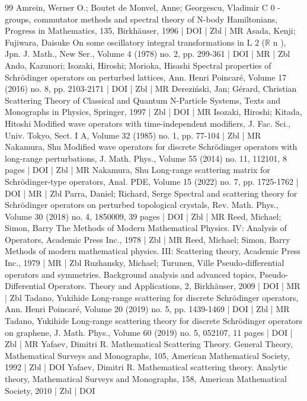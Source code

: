\begin{thebibliography}{99}
 Amrein, Werner O.; Boutet de Monvel, Anne; Georgescu, Vladimir C 0 -groups, commutator methods and spectral theory of N-body Hamiltonians, Progress in Mathematics, 135, Birkhäuser, 1996 | DOI | Zbl | MR
 Asada, Kenji; Fujiwara, Daisuke On some oscillatory integral transformations in L 2 ($\mathbb{R}$ n ), Jpn. J. Math., New Ser., Volume 4 (1978) no. 2, pp. 299-361 | DOI | MR | Zbl
 Ando, Kazunori; Isozaki, Hiroshi; Morioka, Hisashi Spectral properties of Schrödinger operators on perturbed lattices, Ann. Henri Poincaré, Volume 17 (2016) no. 8, pp. 2103-2171 | DOI | Zbl | MR
 Dereziński, Jan; Gérard, Christian Scattering Theory of Classical and Quantum N-Particle Systems, Texts and Monographs in Physics, Springer, 1997 | Zbl | DOI | MR
 Isozaki, Hiroshi; Kitada, Hitoshi Modified wave operators with time-independent modifiers, J. Fac. Sci., Univ. Tokyo, Sect. I A, Volume 32 (1985) no. 1, pp. 77-104 | Zbl | MR
 Nakamura, Shu Modified wave operators for discrete Schrödinger operators with long-range perturbations, J. Math. Phys., Volume 55 (2014) no. 11, 112101, 8 pages | DOI | Zbl | MR
 Nakamura, Shu Long-range scattering matrix for Schrödinger-type operators, Anal. PDE, Volume 15 (2022) no. 7, pp. 1725-1762 | DOI | MR | Zbl
 Parra, Daniel; Richard, Serge Spectral and scattering theory for Schrödinger operators on perturbed topological crystals, Rev. Math. Phys., Volume 30 (2018) no. 4, 1850009, 39 pages | DOI | Zbl | MR
 Reed, Michael; Simon, Barry The Methods of Modern Mathematical Physics. IV: Analysis of Operators, Academic Press Inc., 1978 | Zbl | MR
 Reed, Michael; Simon, Barry Methods of modern mathematical physics. III: Scattering theory, Academic Press Inc., 1979 | MR | Zbl
 Ruzhansky, Michael; Turunen, Ville Pseudo-differential operators and symmetries. Background analysis and advanced topics, Pseudo-Differential Operators. Theory and Applications, 2, Birkhäuser, 2009 | DOI | MR | Zbl
 Tadano, Yukihide Long-range scattering for discrete Schrödinger operators, Ann. Henri Poincaré, Volume 20 (2019) no. 5, pp. 1439-1469 | DOI | Zbl | MR
 Tadano, Yukihide Long-range scattering theory for discrete Schrödinger operators on graphene, J. Math. Phys., Volume 60 (2019) no. 5, 052107, 11 pages | DOI | Zbl | MR
 Yafaev, Dimitri R. Mathematical Scattering Theory. General Theory, Mathematical Surveys and Monographs, 105, American Mathematical Society, 1992 | Zbl | DOI
 Yafaev, Dimitri R. Mathematical scattering theory. Analytic theory, Mathematical Surveys and Monographs, 158, American Mathematical Society, 2010 | Zbl | DOI
\end{thebibliography}

